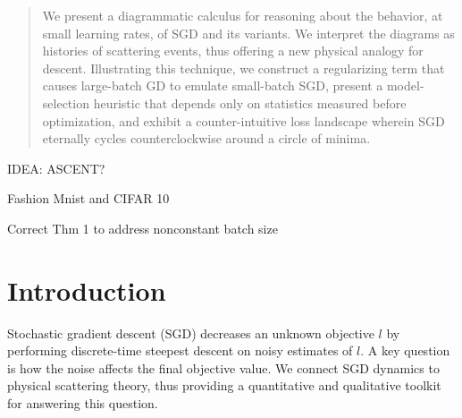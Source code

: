\documentclass{article}
\begin{document}


\printAffiliationsAndNotice{}


\begin{abstract}
    We present a diagrammatic calculus for reasoning about the behavior, at
    small learning rates, of SGD and its variants.  We interpret the diagrams
    as histories of scattering events, thus offering a new physical analogy for
    descent.  Illustrating this technique, we construct a regularizing term
    that causes large-batch GD to emulate small-batch SGD, present a
    model-selection heuristic that depends only on statistics measured before
    optimization, and exhibit a counter-intuitive loss landscape wherein SGD
    eternally cycles counterclockwise around a circle of minima. 
\end{abstract}


IDEA: ASCENT?

Fashion Mnist and CIFAR 10

Correct Thm 1 to address nonconstant batch size 

\section{Introduction}
    Stochastic gradient descent (SGD) decreases an unknown objective $l$ by
    performing discrete-time steepest descent on noisy estimates of $l$.  A key
    question is how the noise affects the final objective value.  We connect
    SGD dynamics to physical scattering theory, thus providing a quantitative
    and qualitative toolkit for answering this question.
\end{document}
